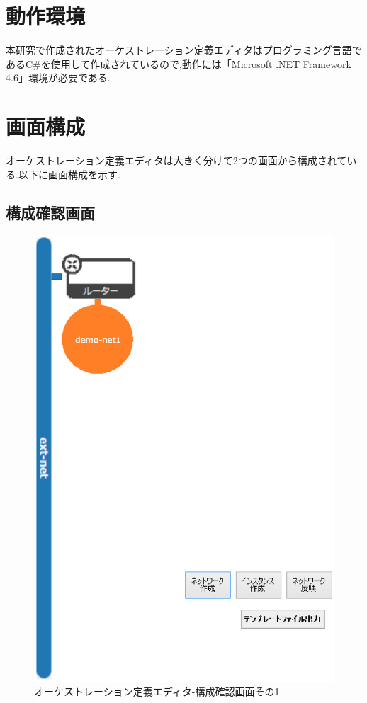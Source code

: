 \documentclass[mingoth]{kut-paper}		%
\begin{document}
	\section{動作環境}
	本研究で作成されたオーケストレーション定義エディタはプログラミング言語であるC\#を使用して作成されているので,動作には「Microsoft .NET Framework 4.6」環境が必要である.
	\section{画面構成}
	オーケストレーション定義エディタは大きく分けて2つの画面から構成されている.以下に画面構成を示す.
		\subsection{構成確認画面}
		\begin{figure}[H]
			\begin{center}
				\includegraphics[scale=0.5]{Document/構成確認画面１.eps}
				\caption{オーケストレーション定義エディタ-構成確認画面その1}
				\label{pic:1}
			\end{center}
		\end{figure}
		
\end{document}
